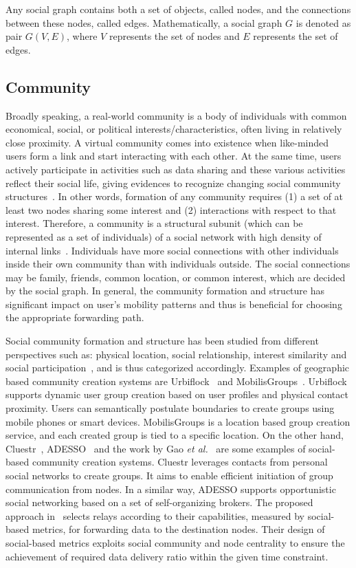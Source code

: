 Any social graph contains both a set of objects, called nodes, and the connections between these nodes, called edges. Mathematically, a social graph $G$ is denoted as pair $G(V,E)$, where $V$ represents the set of nodes and $E$ represents the set of edges.

\subsection{Community}\label{Chap2_01_02}
Broadly speaking, a real-world community is a body of individuals with common economical, social, or political interests/characteristics, often living in relatively close proximity. A virtual community comes into existence when like-minded users form a link and start interacting with each other. At the same time, users actively participate in activities such as data sharing and these various activities reflect their social life, giving evidences to recognize changing social community structures~\cite{LTang2011}. In other words, formation of any community requires (1) a set of at least two nodes sharing some interest and (2) interactions with respect to that interest. Therefore, a community is a structural subunit (which can be represented as a set of individuals) of a social network with high density of internal links~\cite{FLi2009}. Individuals have more social connections with other individuals inside their own community than with individuals outside. The social connections may be family, friends, common location, or common interest, which are decided by the social graph. In general, the community formation and structure has significant impact on user's mobility patterns and thus is beneficial for choosing the appropriate forwarding path.

Social community formation and structure has been studied from different perspectives such as: physical location, social relationship, interest similarity and social participation~\cite{DZhang2011}\cite{EGBoix2011}, and is thus categorized accordingly. Examples of geographic based community creation systems are Urbiflock~\cite{EGBoix2011} and MobilisGroups~\cite{RLubke2011}.  Urbiflock supports dynamic user group creation based on user profiles and physical contact proximity. Users can semantically postulate boundaries to create groups using mobile phones or smart devices. MobilisGroups is a location based group creation service, and each created group is tied to a specific location. On the other hand, Cluestr~\cite{RGrob2009}, ADESSO~\cite{SBMokhtar2010} and the work by Gao {\it et al.}~\cite{WGao2012} are some examples of social-based community creation systems. Cluestr leverages contacts from personal social networks to create groups. It aims to enable efficient initiation of group communication from nodes. In a similar way, ADESSO supports opportunistic social networking based on a set of self-organizing brokers. The proposed approach in~\cite{WGao2012} selects relays according to their capabilities, measured by social-based metrics, for forwarding data to the destination nodes. Their design of social-based metrics exploits social community and node centrality to ensure the achievement of required data delivery ratio within the given time constraint.

